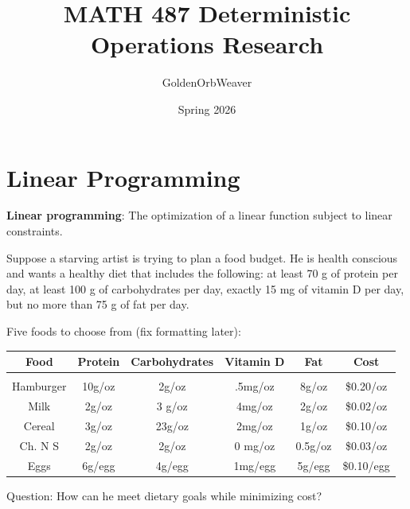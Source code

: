 \documentclass{article}
\title{\textbf{MATH 487 Deterministic Operations Research}}
\author{GoldenOrbWeaver}
\date{Spring 2026}
\begin{document}
\maketitle

\tableofcontents{\textbf{}}

\pagebreak

\pagestyle{fancy}
\fancyhead{}
\fancyhead[L]{\thetitle}

\section{Linear Programming}
\begin{definition}
    \textbf{Linear programming}: The optimization of a linear function subject to linear constraints.
\end{definition}

\begin{eg}
    Suppose a starving artist is trying to plan a food budget. He is health 
    conscious and wants a healthy diet that includes the following: at least
    70 g of protein per day, at least 100 g of carbohydrates per day, exactly
     15 mg of vitamin D per day, but no more than 75 g of fat per day.

     Five foods to choose from (fix formatting later): \\
    \begin{tabular}
    { |c | c | c | c | c | c | }
     \hline
     Food & Protein & Carbohydrates & Vitamin D & Fat & Cost \\
     \hline \\
        Hamburger & 10g/oz & 2g/oz & .5mg/oz & 8g/oz & \$0.20/oz \\
        Milk & 2g/oz & 3 g/oz & 4mg/oz & 2g/oz & \$0.02/oz \\
        Cereal & 3g/oz & 23g/oz & 2mg/oz & 1g/oz & \$0.10/oz \\
        Ch. N S & 2g/oz & 2g/oz & 0 mg/oz & 0.5g/oz & \$0.03/oz\\
        Eggs & 6g/egg & 4g/egg & 1mg/egg & 5g/egg & \$0.10/egg\\
     \hline

    \end{tabular}
     
    Question: How can he meet dietary goals while minimizing cost?
\end{eg}
\end{document}

